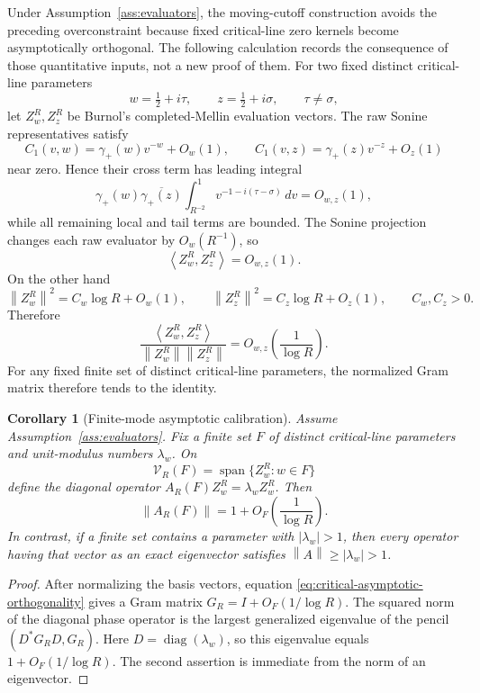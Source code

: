 \documentclass[11pt]{article}
\newtheorem{corollary}[theorem]{Corollary}
\theoremstyle{remark}
\newcommand{\norm}[1]{\left\lVert #1\right\rVert}
\newcommand{\ip}[2]{\left\langle #1,#2\right\rangle}
\begin{document}
Under Assumption~\ref{ass:evaluators}, the moving-cutoff construction avoids the preceding overconstraint because fixed critical-line zero kernels become asymptotically orthogonal. The following calculation records the consequence of those quantitative inputs, not a new proof of them.  For two fixed distinct critical-line parameters
\[
 w=\tfrac12+i\tau,\qquad z=\tfrac12+i\sigma,\qquad \tau\ne\sigma,
\]
let $Z_w^R,Z_z^R$ be Burnol's completed-Mellin evaluation vectors.  The raw Sonine representatives satisfy
\[
 C_1(v,w)=\gamma_+(w)v^{-w}+O_w(1),
 \qquad
 C_1(v,z)=\gamma_+(z)v^{-z}+O_z(1)
\]
near zero.  Hence their cross term has leading integral
\[
 \gamma_+(w)\overline{\gamma_+(z)}
 \int_{R^{-2}}^1 v^{-1-i(\tau-\sigma)}\,dv=O_{w,z}(1),
\]
while all remaining local and tail terms are bounded.  The Sonine projection changes each raw evaluator by $O_w(R^{-1})$, so
\begin{equation}\label{eq:critical-cross-bounded}
 \ip{Z_w^R}{Z_z^R}=O_{w,z}(1).
\end{equation}
On the other hand
\[
 \norm{Z_w^R}^2=C_w\log R+O_w(1),
 \qquad
 \norm{Z_z^R}^2=C_z\log R+O_z(1),
 \qquad C_w,C_z>0.
\]
Therefore
\begin{equation}\label{eq:critical-asymptotic-orthogonality}
 \boxed{
 \frac{\ip{Z_w^R}{Z_z^R}}
 {\norm{Z_w^R}\norm{Z_z^R}}
 =O_{w,z}\!\left(\frac1{\log R}\right).}
\end{equation}
For any fixed finite set of distinct critical-line parameters, the normalized Gram matrix therefore tends to the identity.

\begin{corollary}[Finite-mode asymptotic calibration]\label{cor:finite-mode-calibration}
Assume Assumption~\ref{ass:evaluators}. Fix a finite set $F$ of distinct critical-line parameters and unit-modulus numbers $\lambda_w$.  On
\[
 \mathcal V_R(F)=\operatorname{span}\{Z_w^R:w\in F\}
\]
define the diagonal operator $A_R(F)Z_w^R=\lambda_w Z_w^R$.  Then
\[
 \norm{A_R(F)}=1+O_F\!\left(\frac1{\log R}\right).
\]
In contrast, if a finite set contains a parameter with $|\lambda_w|>1$, then every operator having that vector as an exact eigenvector satisfies $\norm A\ge |\lambda_w|>1$.
\end{corollary}
\begin{proof}
After normalizing the basis vectors, equation \eqref{eq:critical-asymptotic-orthogonality} gives a Gram matrix $G_R=I+O_F(1/\log R)$.  The squared norm of the diagonal phase operator is the largest generalized eigenvalue of the pencil $(D^*G_RD,G_R)$.  Here $D=\operatorname{diag}(\lambda_w)$, so this eigenvalue equals $1+O_F(1/\log R)$.  The second assertion is immediate from the norm of an eigenvector.
\end{proof}
\end{document}
